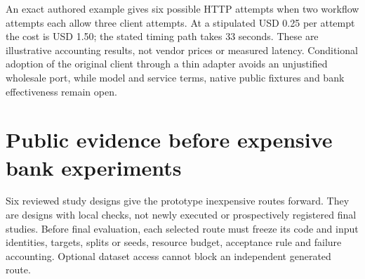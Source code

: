 An exact authored example gives six possible HTTP attempts when two
workflow attempts each allow three client attempts. At a stipulated USD
0.25 per attempt the cost is USD 1.50; the stated timing path takes 33
seconds. These are illustrative accounting results, not vendor prices or
measured latency. Conditional adoption of the original client through a
thin adapter avoids an unjustified wholesale port, while model and
service terms, native public fixtures and bank effectiveness remain
open. \citep{exec28_oa_reference}

\hypertarget{public-evidence-before-expensive-bank-experiments}{%
\section{Public evidence before expensive bank
experiments}\label{public-evidence-before-expensive-bank-experiments}}

Six reviewed study designs give the prototype inexpensive routes
forward. They are designs with local checks, not newly executed or
prospectively registered final studies. Before final evaluation, each
selected route must freeze its code and input identities, targets,
splits or seeds, resource budget, acceptance rule and failure
accounting. Optional dataset access cannot block an independent
generated route. \citep{sp13_public}


